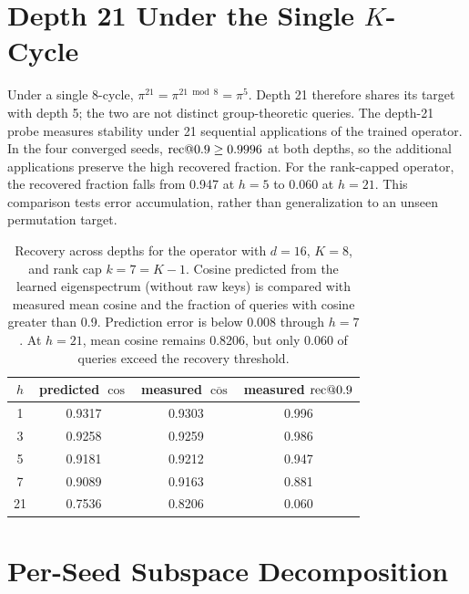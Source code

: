 \appendix

\section{Depth 21 Under the Single $K$-Cycle}
\label{app:period}

Under a single 8-cycle, $\pi^{21} = \pi^{21 \bmod 8} = \pi^{5}$.
Depth 21 therefore shares its target with depth 5; the two are not
distinct group-theoretic queries. The depth-21 probe measures
stability under 21 sequential applications of the trained operator.
In the four converged seeds, $\mathrm{rec}@0.9 \geq 0.9996$ at both depths,
so the additional applications preserve the high recovered fraction.
For the rank-capped operator, the recovered fraction falls from
0.947 at $h{=}5$ to 0.060 at $h{=}21$.
This comparison tests error accumulation, rather than generalization
to an unseen permutation target.

\begin{table}[H]
\centering
\small
\begin{tabular}{cccc}
\toprule
$h$ & predicted $\cos$ & measured $\overline{\cos}$ & measured $\mathrm{rec}@0.9$ \\
\midrule
1  & 0.9317 & 0.9303 & 0.996 \\
3  & 0.9258 & 0.9259 & 0.986 \\
5  & 0.9181 & 0.9212 & 0.947 \\
7  & 0.9089 & 0.9163 & 0.881 \\
21 & 0.7536 & 0.8206 & 0.060 \\
\bottomrule
\end{tabular}
\caption{Recovery across depths for the operator with $d=16$, $K=8$,
and rank cap $k = 7 = K - 1$. Cosine predicted from the learned eigenspectrum
(without raw keys) is compared with measured mean cosine and the
fraction of queries with cosine greater than 0.9. Prediction error
is below 0.008 through $h = 7$. At $h = 21$, mean cosine remains
0.8206, but only 0.060 of queries exceed the recovery threshold.}
\label{tab:depthcurve}
\end{table}

\section{Per-Seed Subspace Decomposition}
\label{app:subspace}


